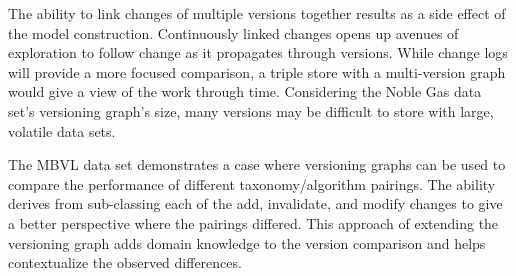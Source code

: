 The ability to link changes of multiple versions together results as a side effect of the model construction.
Continuously linked changes opens up avenues of exploration to follow change as it propagates through versions.
While change logs will provide a more focused comparison, a triple store with a multi-version graph would give a view of the work through time.
Considering the Noble Gas data set's versioning graph's size, many versions may be difficult to store with large, volatile data sets.

The MBVL data set demonstrates a case where versioning graphs can be used to compare the performance of different taxonomy/algorithm pairings.
The ability derives from sub-classing each of the add, invalidate, and modify changes to give a better perspective where the pairings differed.
This approach of extending the versioning graph adds domain knowledge to the version comparison and helps contextualize the observed differences.
